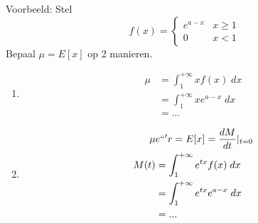 \documentclass[12pt]{report}
\newcommand{\example}[2]{
      \hrulefill
      
      Voorbeeld: #1
      
      #2
      
      \hrulefill
  }
\begin{document}
\example{Stel $$f(x) = \begin{cases}
                       e^{a - x} & x \geq 1 \\
                       0         & x < 1
                      \end{cases}
$$
Bepaal $\mu = E[x]$ op 2 manieren.}{

\begin{enumerate}
 \item 
  \begin{equation*}
   \begin{split}
    \mu & = \int_{1}^{+\infty} x f(x)\; dx \\
        & = \int_{1}^{+\infty} x e^{a-x}\; dx \\
        & = ...
   \end{split}
  \end{equation*}
 \item
  \begin{equation*}
   \begin{split}
   \mu & e``'r= E[x] = \frac{dM}{dt}|_{t = 0} \\
    M(t) & = \int_{1}^{+\infty}e^{tx} f(x)\; dx \\
         & = \int_{1}^{+\infty} e^{tx} e^{a-x}\; dx \\
         & = ...
   \end{split}
  \end{equation*}
\end{enumerate}
}
\end{document}

